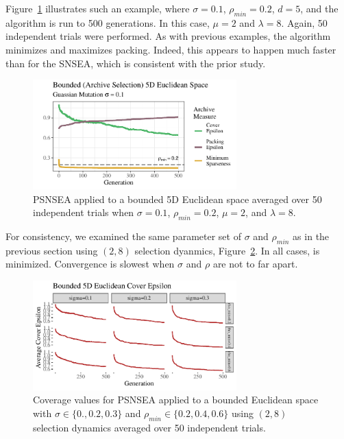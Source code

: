 \documentclass[twoside]{article}
\begin{document}
Figure~\ref{fig:bounded:mu2lam8:0102} illustrates such an example, where $\sigma=0.1$, $\rho_{min}= 0.2$, $d=5$, and the algorithm is run to 500 generations.  In this case, $\mu=2$ and $\lambda=8$.  Again, 50 independent trials were performed.  As with previous examples, the algorithm minimizes  and maximizes packing.  Indeed, this appears to happen much faster than for the SNSEA, which is consistent with the prior study.
%
\begin{figure}[h]
  \center\includegraphics[width=0.7\textwidth]{Figures/bounded-500-s01r02-mu2lam8.pdf}
  \caption{\label{fig:bounded:mu2lam8:0102} PSNSEA applied to a bounded 5D Euclidean space averaged over 50 independent trials when $\sigma=0.1$, $\rho_{min}=0.2$, $\mu=2$, and $\lambda=8$.}
\end{figure}

For consistency, we examined the same parameter set of $\sigma$ and $\rho_{min}$ as in the previous section using $(2,8)$ selection dyanmics, Figure~\ref{fig:bounded:mu2lam8:sm}.  In all cases,  is minimized.  Convergence is slowest when $\sigma$ and $\rho$ are not to far apart.
%
\begin{figure}[t]
  \center\includegraphics[width=0.7\textwidth]{Figures/bounded-500-sm-mu2lam8.pdf}
  \caption{\label{fig:bounded:mu2lam8:sm} Coverage values for PSNSEA applied to a bounded Euclidean space with $\sigma\in\{0.,  0.2, 0.3\}$ and $\rho_{min} \in \{0.2, 0.4, 0.6\}$ using $(2,8)$ selection dynamics averaged over 50 independent trials.}
\end{figure}
\end{document}
